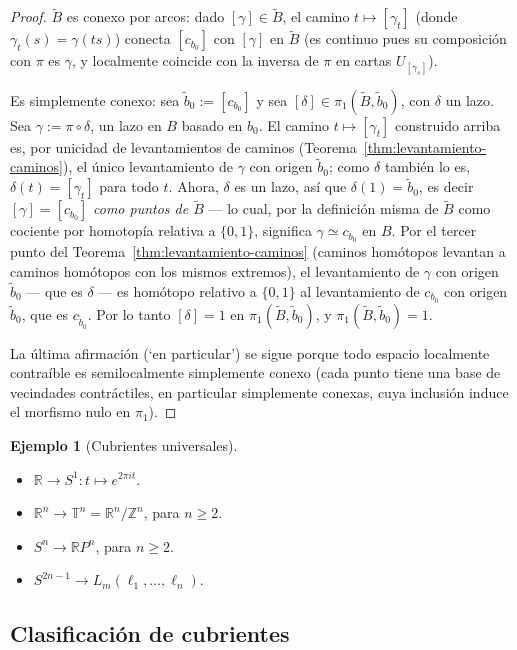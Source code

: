 \documentclass[11pt,a4paper]{article}
\theoremstyle{plain}
\theoremstyle{definition}
\newtheorem{example}[theorem]{Ejemplo}
\theoremstyle{remark}
\newcommand{\RR}{\mathbb R}
\newcommand{\ZZ}{\mathbb Z}
\begin{document}
\begin{proof}
$\tilde B$ es conexo por arcos: dado $[\gamma]\in\tilde B$, el camino
$t\mapsto[\gamma_t]$ (donde $\gamma_t(s)=\gamma(ts)$) conecta
$[c_{b_0}]$ con $[\gamma]$ en $\tilde B$ (es continuo pues su composición
con $\pi$ es $\gamma$, y localmente coincide con la inversa de $\pi$ en
cartas $U_{[\gamma_s]}$).

Es simplemente conexo: sea $\tilde b_0:=[c_{b_0}]$ y sea
$[\delta]\in\pi_1(\tilde B,\tilde b_0)$, con $\delta$ un lazo. Sea
$\gamma:=\pi\circ\delta$, un lazo en $B$ basado en $b_0$. El camino
$t\mapsto[\gamma_t]$ construido arriba es, por unicidad de levantamientos
de caminos (Teorema~\ref{thm:levantamiento-caminos}), el único
levantamiento de $\gamma$ con origen $\tilde b_0$; como $\delta$ también
lo es, $\delta(t)=[\gamma_t]$ para todo $t$. Ahora, $\delta$ es un lazo,
así que $\delta(1)=\tilde b_0$, es decir $[\gamma]=[c_{b_0}]$
\emph{como puntos de $\tilde B$} --- lo cual, por la definición misma de
$\tilde B$ como cociente por homotopía relativa a $\{0,1\}$, significa
$\gamma\simeq c_{b_0}$ en $B$. Por el tercer punto del
Teorema~\ref{thm:levantamiento-caminos} (caminos homótopos levantan a
caminos homótopos con los mismos extremos), el levantamiento de $\gamma$
con origen $\tilde b_0$ --- que es $\delta$ --- es homótopo relativo a
$\{0,1\}$ al levantamiento de $c_{b_0}$ con origen $\tilde b_0$, que es
$c_{\tilde b_0}$. Por lo tanto $[\delta]=1$ en $\pi_1(\tilde B,\tilde b_0)$,
y $\pi_1(\tilde B,\tilde b_0)=1$.

La última afirmación (`en particular') se sigue porque todo espacio
localmente contraíble es semilocalmente simplemente conexo (cada punto
tiene una base de vecindades contráctiles, en particular simplemente
conexas, cuya inclusión induce el morfismo nulo en $\pi_1$).
\end{proof}

\begin{example}[Cubrientes universales]
\label{ex:cubrientes-universales}
\begin{itemize}
\item $\RR\to S^1: t\mapsto e^{2\pi it}$.
\item $\RR^n\to\mathbb T^n=\RR^n/\ZZ^n$, para $n\ge2$.
\item $S^n\to\RR P^n$, para $n\ge2$.
\item $S^{2n-1}\to L_m(\ell_1,\dots,\ell_n)$.
\end{itemize}
\end{example}

\subsection{Clasificación de cubrientes}
\end{document}
